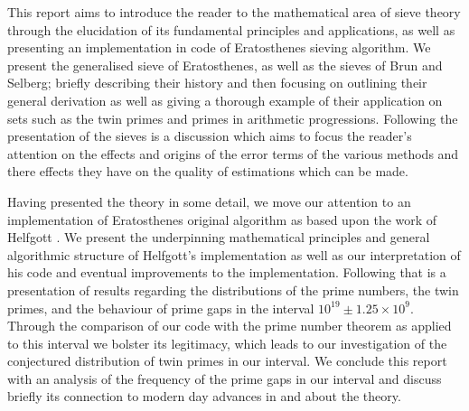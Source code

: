 This report aims to introduce the reader to the mathematical area of sieve theory through the elucidation of its fundamental principles and applications, as well as presenting an implementation in code of Eratosthenes sieving algorithm. 
We present the generalised sieve of Eratosthenes, as well as the sieves of Brun and Selberg; briefly describing their history and then focusing on outlining their general derivation as well as giving a thorough example of their application on sets such as the twin primes and primes in arithmetic progressions. 
Following the presentation of the sieves is a discussion which aims to focus the reader's attention on the effects and origins of the error terms of the various methods and there effects they have on the quality of estimations which can be made.

Having presented the theory in some detail, we move our attention to an implementation of Eratosthenes original algorithm as based upon the work of Helfgott \cite{HaraldSieve}.
We present the underpinning mathematical principles and general algorithmic structure of Helfgott's implementation as well as our interpretation of his code and eventual improvements to the implementation.
Following that is a presentation of results regarding the distributions of the prime numbers, the twin primes, and the behaviour of prime gaps in the interval \(10^{19}\pm 1.25\times10^9\).
Through the comparison of our code with the prime number theorem as applied to this interval we bolster its legitimacy, which leads to our investigation of the conjectured distribution of twin primes in our interval.
We conclude this report with an analysis of the frequency of the prime gaps in our interval and discuss briefly its connection to modern day advances in and about the theory.